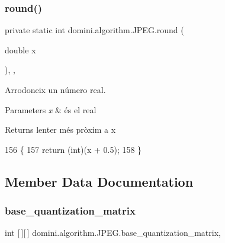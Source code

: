 \subsubsection{\texorpdfstring{round()}{round()}}
{\footnotesize\ttfamily private static int domini.\+algorithm.\+J\+P\+E\+G.\+round (\begin{DoxyParamCaption}\item[{double}]{x }\end{DoxyParamCaption})\hspace{0.3cm}{\ttfamily [inline]}, {\ttfamily [static]}, {\ttfamily [private]}}



Arrodoneix un número real. 


\begin{DoxyParams}{Parameters}
{\em x} & és el real \\
\hline
\end{DoxyParams}
\begin{DoxyReturn}{Returns}
l\textquotesingle{}enter més pròxim a x 
\end{DoxyReturn}

\begin{DoxyCode}
156                                        \{
157         \textcolor{keywordflow}{return} (\textcolor{keywordtype}{int})(x + 0.5);
158     \}
\end{DoxyCode}


\subsection{Member Data Documentation}
\mbox{\label{classdomini_1_1algorithm_1_1JPEG_a1f91c0bad6cfd3ac22bec68bc28564c5}} 
\subsubsection{\texorpdfstring{base\+\_\+quantization\+\_\+matrix}{base\_quantization\_matrix}}
{\footnotesize\ttfamily int \mbox{[}$\,$\mbox{]}\mbox{[}$\,$\mbox{]} domini.\+algorithm.\+J\+P\+E\+G.\+base\+\_\+quantization\+\_\+matrix\hspace{0.3cm}{\ttfamily [static]}, {\ttfamily [private]}}

